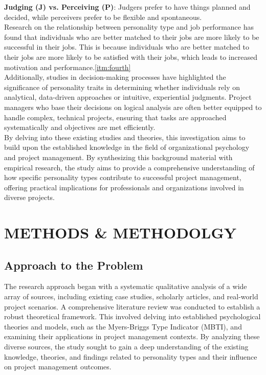 \documentclass[a4Paper]{article}
\begin{document}
\textbf{Judging (J) vs. Perceiving (P)}: Judgers prefer to have things planned and decided, while perceivers prefer to be flexible and spontaneous.\\

Research on the relationship between personality type and job performance has found that individuals who are better matched to their jobs are more likely to be successful in their jobs. This is because individuals who are better matched to their jobs are more likely to be satisfied with their jobs, which leads to increased motivation and performance.\ref{itm:fourth}\\

Additionally, studies in decision-making processes have highlighted the significance of personality traits in determining whether individuals rely on analytical, data-driven approaches or intuitive, experiential judgments. Project managers who base their decisions on logical analysis are often better equipped to handle complex, technical projects, ensuring that tasks are approached systematically and objectives are met efficiently.\\

By delving into these existing studies and theories, this investigation aims to build upon the established knowledge in the field of organizational psychology and project management. By synthesizing this background material with empirical research, the study aims to provide a comprehensive understanding of how specific personality types contribute to successful project management, offering practical implications for professionals and organizations involved in diverse projects.

\pagebreak


\section{METHODS \& METHODOLGY}

\subsection{Approach to the Problem}
The research approach began with a systematic qualitative analysis of a wide array of sources, including existing case studies, scholarly articles, and real-world project scenarios. A comprehensive literature review was conducted to establish a robust theoretical framework. This involved delving into established psychological theories and models, such as the Myers-Briggs Type Indicator (MBTI), and examining their applications in project management contexts. By analyzing these diverse sources, the study sought to gain a deep understanding of the existing knowledge, theories, and findings related to personality types and their influence on project management outcomes.\\
\end{document}
